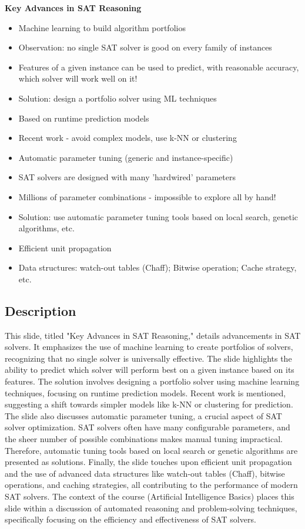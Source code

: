 \documentclass{article}%
\begin{document}
\textbf{Key Advances in SAT Reasoning}

\begin{itemize}
    \item Machine learning to build algorithm portfolios
    \item Observation: no single SAT solver is good on every family of instances
    \item Features of a given instance can be used to predict, with reasonable accuracy, which solver will work well on it!
    \item Solution: design a portfolio solver using ML techniques
    \item Based on runtime prediction models
    \item Recent work - avoid complex models, use k-NN or clustering
    \item Automatic parameter tuning (generic and instance-specific)
    \item SAT solvers are designed with many 'hardwired' parameters
    \item Millions of parameter combinations - impossible to explore all by hand!
    \item Solution: use automatic parameter tuning tools based on local search, genetic algorithms, etc.
    \item Efficient unit propagation
    \item Data structures: watch-out tables (Chaff); Bitwise operation; Cache strategy, etc.
\end{itemize}
%
\subsection{Description}%
This slide, titled "Key Advances in SAT Reasoning," details advancements in SAT solvers.  It emphasizes the use of machine learning to create portfolios of solvers, recognizing that no single solver is universally effective.  The slide highlights the ability to predict which solver will perform best on a given instance based on its features.  The solution involves designing a portfolio solver using machine learning techniques, focusing on runtime prediction models.  Recent work is mentioned, suggesting a shift towards simpler models like k-NN or clustering for prediction.  The slide also discusses automatic parameter tuning, a crucial aspect of SAT solver optimization.  SAT solvers often have many configurable parameters, and the sheer number of possible combinations makes manual tuning impractical.  Therefore, automatic tuning tools based on local search or genetic algorithms are presented as solutions.  Finally, the slide touches upon efficient unit propagation and the use of advanced data structures like watch-out tables (Chaff), bitwise operations, and caching strategies, all contributing to the performance of modern SAT solvers.  The context of the course (Artificial Intelligence Basics) places this slide within a discussion of automated reasoning and problem-solving techniques, specifically focusing on the efficiency and effectiveness of SAT solvers.%
\end{document}
